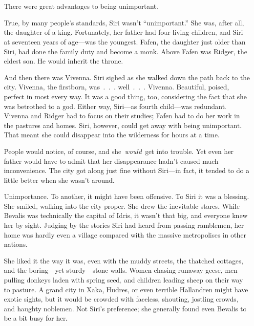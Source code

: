 \chapter{}

There were great advantages to being unimportant.

True, by many people’s standards, Siri wasn’t “unimportant.” She was, after all, the daughter of a king. Fortunately, her father had four living children, and Siri—at seventeen years of age—was the youngest. Fafen, the daughter just older than Siri, had done the family duty and become a monk. Above Fafen was Ridger, the eldest son. He would inherit the throne.

And then there was Vivenna. Siri sighed as she walked down the path back to the city. Vivenna, the firstborn, was~.~.~. well~.~.~. Vivenna. Beautiful, poised, perfect in most every way. It was a good thing, too, considering the fact that she was betrothed to a god. Either way, Siri—as fourth child—was redundant. Vivenna and Ridger had to focus on their studies; Fafen had to do her work in the pastures and homes. Siri, however, could get away with being unimportant. That meant she could disappear into the wilderness for hours at a time.

People would notice, of course, and she~\textit{would}~get into trouble. Yet even her father would have to admit that her disappearance hadn’t caused much inconvenience. The city got along just fine without Siri—in fact, it tended to do a little better when she wasn’t around.

Unimportance. To another, it might have been offensive. To Siri it was a blessing. She smiled, walking into the city proper. She drew the inevitable stares. While Bevalis was technically the capital of Idris, it wasn’t that big, and everyone knew her by sight. Judging by the stories Siri had heard from passing ramblemen, her home was hardly even a village compared with the massive metropolises in other nations.

She liked it the way it was, even with the muddy streets, the thatched cottages, and the boring—yet sturdy—stone walls. Women chasing runaway geese, men pulling donkeys laden with spring seed, and children leading sheep on their way to pasture. A grand city in Xaka, Hudres, or even terrible Hallandren might have exotic sights, but it would be crowded with faceless, shouting, jostling crowds, and haughty noblemen. Not Siri’s preference; she generally found even Bevalis to be a bit busy for her.

